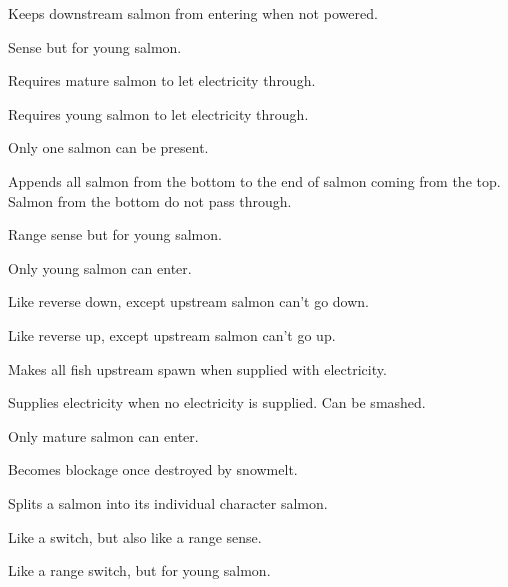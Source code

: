 \documentclass[10pt]{article}
\begin{document}
Keeps downstream salmon from entering when not powered.


Sense but for young salmon.


Requires mature salmon to let electricity through.


Requires young salmon to let electricity through.


Only one salmon can be present.


Appends all salmon from the bottom to the end of salmon coming from the top. Salmon from the bottom do not pass through.


Range sense but for young salmon.


Only young salmon can enter.


Like reverse down, except upstream salmon can't go down.


Like reverse up, except upstream salmon can't go up.


Makes all fish upstream spawn when supplied with electricity.


Supplies electricity when no electricity is supplied. Can be smashed.


Only mature salmon can enter.


Becomes blockage once destroyed by snowmelt.


Splits a salmon into its individual character salmon.


Like a switch, but also like a range sense.


Like a range switch, but for young salmon.
\end{document}
